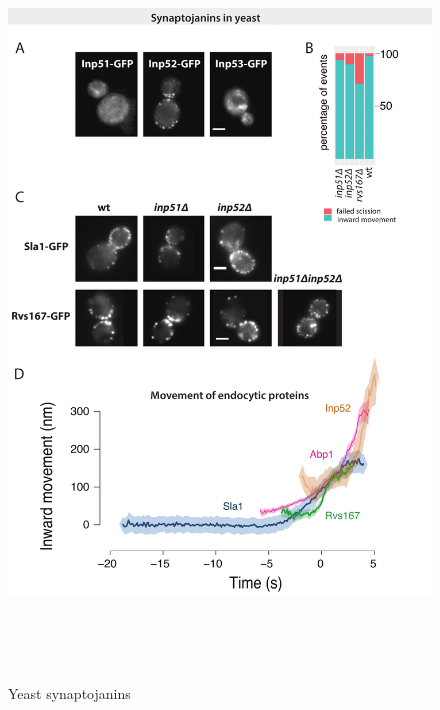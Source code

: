 	\begin{figure}
	\centering
	\includegraphics[width=20cm,height=20cm,keepaspectratio]{figures/results_final/inp}
	\caption{Yeast synaptojanins \label{fig4_inp}}
	\end{figure}

